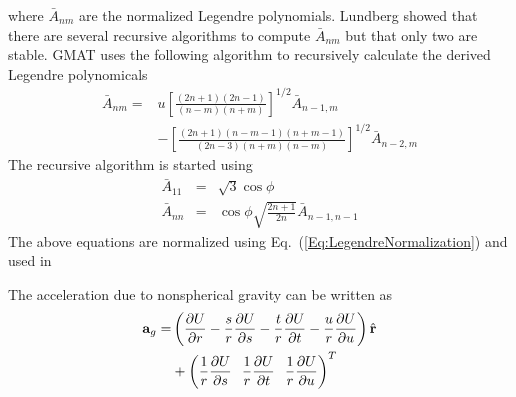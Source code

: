 %
where $\bar{A}_{nm}$ are the normalized Legendre polynomials.
Lundberg\cite{Lundberg:88} showed that there are several recursive
algorithms to compute $\bar{A}_{nm}$  but that only two are stable.
GMAT uses the following algorithm to recursively calculate the
derived Legendre polynomicals
%
\begin{equation}
     \begin{split}
     \bar{A}_{nm} = & u\left[ \frac{(2n+1)(2n-1)}{(n-m)(n+m)}
     \right]^{1/2}\bar{A}_{n-1,m}  \\
     & - \left[ \frac{(2n+1)(n-m-1)(n+m-1)}{(2n-3)(n+m)(n-m)}
     \right]^{1/2}\bar{A}_{n-2,m}
     \end{split}
\end{equation}
%
The recursive algorithm is started using
%
\begin{eqnarray}
     \bar{A}_{11} & = & \sqrt{3} \cos{\phi}\\
     \bar{A}_{nn} & = & \cos{\phi}\sqrt{\frac{2n+1}{2n}}\bar{A}_{n-1,n-1}
\end{eqnarray}
%
The above equations are normalized using
Eq.~(\ref{Eq:LegendreNormalization}) and used in


The acceleration due to nonspherical gravity can be written as
%
\begin{equation}
   \begin{split}
   \mathbf{a}_g = & \left( \frac{\partial U}{\partial r} - \frac{s}{r}\frac{\partial U}{\partial s}
    -\frac{t}{r}\frac{\partial U}{\partial t} -\frac{u}{r}\frac{\partial U}{\partial u}
    \right) \hat{\mathbf{r}}\\
    & + \left( \frac{1}{r}\frac{\partial U}{\partial s} \hspace{.1
    in} \frac{1}{r}\frac{\partial U}{\partial t}  \hspace{.1
    in} \frac{1}{r}\frac{\partial U}{\partial u}\right)^T
    \end{split} \label{Eq:NonSphericalAcc}
\end{equation}
%


